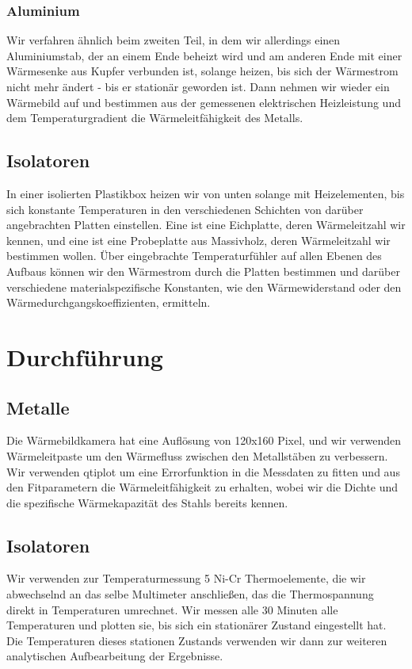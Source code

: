 \documentclass[12pt,a4paper,twopage]{article}
\begin{document}
\subsubsection*{Aluminium}
Wir verfahren ähnlich beim zweiten Teil, in dem wir allerdings einen Aluminiumstab, der an einem Ende beheizt wird und am anderen Ende mit einer Wärmesenke aus Kupfer verbunden ist, solange heizen, bis sich der Wärmestrom nicht mehr ändert - bis er stationär geworden ist. Dann nehmen wir wieder ein Wärmebild auf und bestimmen aus der gemessenen elektrischen Heizleistung und dem Temperaturgradient die Wärmeleitfähigkeit des Metalls.
\subsection{Isolatoren}
In einer isolierten Plastikbox heizen wir von unten solange mit Heizelementen, bis sich konstante Temperaturen in den verschiedenen Schichten von darüber angebrachten Platten einstellen. Eine ist eine Eichplatte, deren Wärmeleitzahl wir kennen, und eine ist eine Probeplatte aus Massivholz, deren Wärmeleitzahl wir bestimmen wollen. Über eingebrachte Temperaturfühler auf allen Ebenen des Aufbaus können wir den Wärmestrom durch die Platten bestimmen und darüber verschiedene materialspezifische Konstanten, wie den Wärmewiderstand oder den Wärmedurchgangskoeffizienten, ermitteln.
\section{Durchführung}
\subsection*{Metalle}
Die Wärmebildkamera hat eine Auflösung von 120x160 Pixel, und wir verwenden Wärmeleitpaste um den Wärmefluss zwischen den Metallstäben zu verbessern. Wir verwenden qtiplot um eine Errorfunktion in die Messdaten zu fitten und aus den Fitparametern die Wärmeleitfähigkeit zu erhalten, wobei wir die Dichte und die spezifische Wärmekapazität des Stahls bereits kennen.
\subsection*{Isolatoren}
Wir verwenden zur Temperaturmessung 5 Ni-Cr Thermoelemente, die wir abwechselnd an das selbe Multimeter anschließen, das die Thermospannung direkt in Temperaturen umrechnet. Wir messen alle 30 Minuten alle Temperaturen und plotten sie, bis sich ein stationärer Zustand eingestellt hat. Die Temperaturen dieses stationen Zustands verwenden wir dann zur weiteren analytischen Aufbearbeitung der Ergebnisse.
\end{document}
